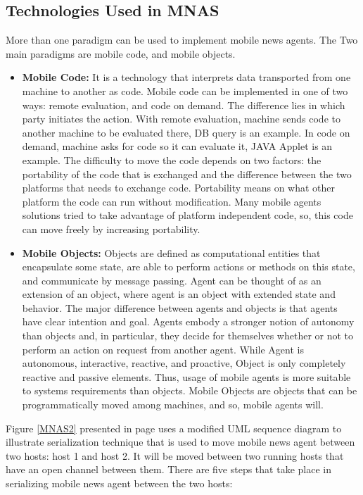 \documentclass[12pt,a4paper,final,twoside,onecolumn,titlepage]{book}
\begin{document}
\subsection{Technologies Used in MNAS}
More than one paradigm can be used to implement mobile news agents. The Two main paradigms are mobile code, and mobile objects.
\begin{itemize}
\item \textbf{Mobile Code:} It is a technology that interprets data transported from one machine to another as code. Mobile code can be implemented in one of two ways: remote evaluation, and code on demand. The difference lies in which party initiates the action. With remote evaluation, machine sends code to another machine to be evaluated there, \gls{DB} query is an example. In code on demand, machine asks for code so it can evaluate it, JAVA Applet is an example. The difficulty to move the code depends on two factors: the portability of the code that is exchanged and the difference between the two platforms that needs to exchange code. Portability means on what other platform the code can run without modification. Many mobile agents solutions tried to take advantage of platform independent code, so, this code can move freely by increasing portability. 
\item \textbf{Mobile Objects:} Objects are defined as computational entities that encapsulate some state, are able to perform actions or methods on this state, and communicate by message passing. Agent can be thought of as an extension of an object, where agent is an object with extended state and behavior. The major difference between agents and objects is that agents have clear intention and goal. Agents embody a stronger notion of autonomy than objects and, in particular, they decide for themselves whether or not to perform an action on request from another agent. While Agent is autonomous, interactive, reactive, and proactive, Object is only completely reactive and passive elements. Thus, usage of mobile agents is more suitable to systems requirements than objects. Mobile Objects are objects that can be programmatically moved among machines, and so, mobile agents will.
\end{itemize}
Figure \ref{MNAS2} presented in page \pageref{MNAS2} uses a modified UML sequence diagram to illustrate serialization technique that is used to move mobile news agent between two hosts: host 1 and host 2. It will be moved between two running hosts that have an open channel between them. There are five steps that take place in serializing mobile news agent between the two hosts:
\end{document}
